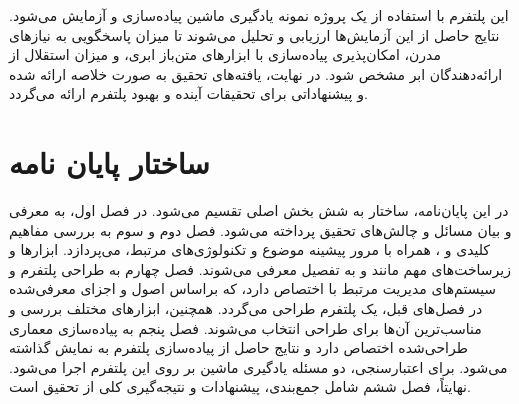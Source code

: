 این پلتفرم با استفاده از یک پروژه نمونه یادگیری ماشین پیاده‌سازی و آزمایش می‌شود. نتایج حاصل از این آزمایش‌ها ارزیابی و تحلیل می‌شوند تا میزان پاسخگویی به نیازهای مدرن، امکان‌پذیری پیاده‌سازی با ابزارهای متن‌باز ابری، و میزان استقلال از ارائه‌دهندگان ابر مشخص شود. در نهایت، یافته‌های تحقیق به صورت خلاصه ارائه شده و پیشنهاداتی برای تحقیقات آینده و بهبود پلتفرم ارائه می‌گردد.

\section{ساختار پایان نامه}

در این پایان‌نامه، ساختار به شش بخش اصلی تقسیم می‌شود. در فصل اول، به معرفی و بیان مسائل و چالش‌های تحقیق پرداخته می‌شود. فصل دوم و سوم به بررسی مفاهیم کلیدی  و ، همراه با مرور پیشینه موضوع و تکنولوژی‌های مرتبط، می‌پردازد. ابزارها و زیرساخت‌های مهم مانند  و  به تفصیل معرفی می‌شوند. فصل چهارم به طراحی پلتفرم و سیستم‌های مدیریت مرتبط با  اختصاص دارد، که براساس اصول و اجزای معرفی‌شده در فصل‌های قبل، یک پلتفرم  طراحی می‌گردد. همچنین، ابزارهای مختلف بررسی و مناسب‌ترین آن‌ها برای طراحی انتخاب می‌شوند. فصل پنجم به پیاده‌سازی معماری طراحی‌شده اختصاص دارد و نتایج حاصل از پیاده‌سازی پلتفرم به نمایش گذاشته می‌شود. برای اعتبارسنجی، دو مسئله یادگیری ماشین بر روی این پلتفرم اجرا می‌شود. نهایتاً، فصل ششم شامل جمع‌بندی، پیشنهادات و نتیجه‌گیری کلی از تحقیق است. 